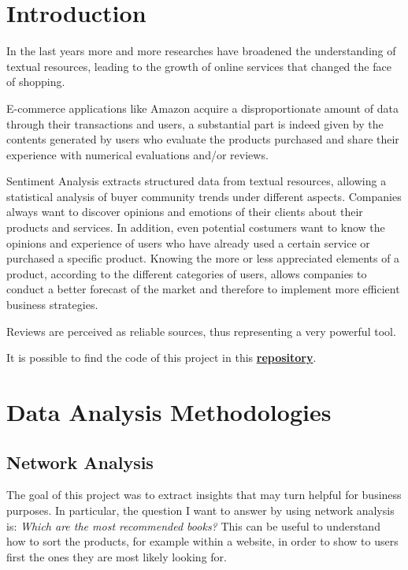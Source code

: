 \documentclass[a4paper,12pt]{article}
\begin{document}
\tableofcontents

\newpage

\section{Introduction}
In the last years more and more researches have broadened the understanding of textual resources, leading to the growth of online services that changed the face of shopping.

\noindent E-commerce applications like Amazon acquire a disproportionate amount of data through their transactions and users, a substantial part is indeed given by the contents generated by users who evaluate the products purchased and share their experience with numerical evaluations and/or reviews. 

\noindent Sentiment Analysis extracts structured data from textual resources, allowing a statistical analysis of buyer community trends under different aspects. Companies always want to discover opinions and emotions of their clients about their products and services. In addition, even potential costumers want to know the opinions and experience of users who have already used a certain service or purchased a specific product. Knowing the more or less appreciated elements of a product, according to the different categories of users, allows companies to conduct a better forecast of the market and therefore to implement more efficient business strategies. 

\noindent Reviews are perceived as reliable sources, thus representing a very powerful tool.
\bigskip

\noindent It is possible to find the code of this project in this \href{https://github.com/okamiRvS/Sentiment-Analysis-for-Amazon-Reviews}{\textbf{repository}}.

\newpage
\section{Data Analysis Methodologies}
\subsection{Network Analysis}
The goal of this project was to extract insights that may turn helpful for business purposes. In particular, the question I want to answer by using network analysis is: \textit{Which are the most recommended books?} This can be useful to understand how to sort the products, for example within a website, in order to show to users first the ones they are most likely looking for.
\end{document}
